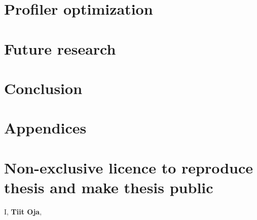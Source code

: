 \documentclass{style/thesis}
\begin{document}
\pagebreak
\section{Profiler optimization}
\label{sec:optimization}


\pagebreak
\section{Future research}
\label{sec:future-research}


\clearpage
\section{Conclusion} 



\newpage

{}


\newpage

\appendix
\section*{Appendices}
\renewcommand{\thesubsection}{\Alph{subsection}}

\pagebreak
\section*{Non-exclusive licence to reproduce thesis and make thesis public}

\renewcommand{\labelenumii}{\theenumii}
\renewcommand{\theenumii}{\theenumi.\arabic{enumii}.}

I, \textbf{Tiit Oja},
\end{document}
